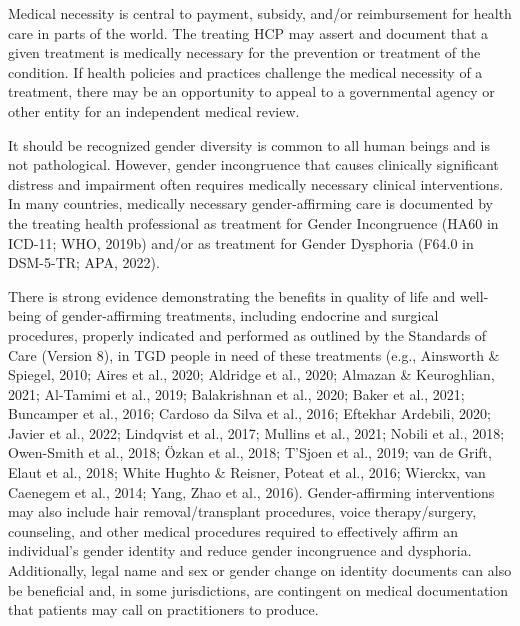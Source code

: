 \documentclass[
]{book}
\begin{document}
Medical necessity is central to payment, subsidy, and/or reimbursement for health care in
parts of the world. The treating HCP may assert
and document that a given treatment is medically
necessary for the prevention or treatment of the
condition. If health policies and practices challenge the medical necessity of a treatment, there
may be an opportunity to appeal to a governmental agency or other entity for an independent
medical review.

It should be recognized gender diversity is
common to all human beings and is not pathological. However, gender incongruence that causes
clinically significant distress and impairment
often requires medically necessary clinical
interventions. In many countries, medically necessary gender-affirming care is documented by
the treating health professional as treatment for
Gender Incongruence (HA60 in ICD-11; WHO,
2019b) and/or as treatment for Gender Dysphoria
(F64.0 in DSM-5-TR; APA, 2022).

There is strong evidence demonstrating the benefits in quality of life and well-being of
gender-affirming treatments, including endocrine
and surgical procedures, properly indicated and
performed as outlined by the Standards of Care
(Version 8), in TGD people in need of these treatments (e.g., Ainsworth \& Spiegel, 2010; Aires
et al., 2020; Aldridge et al., 2020; Almazan \&
Keuroghlian, 2021; Al-Tamimi et al., 2019;
Balakrishnan et al., 2020; Baker et al., 2021;
Buncamper et al., 2016; Cardoso da Silva et al.,
2016; Eftekhar Ardebili, 2020; Javier et al., 2022;
Lindqvist et al., 2017; Mullins et al., 2021; Nobili
et al., 2018; Owen-Smith et al., 2018; Özkan et al.,
2018; T'Sjoen et al., 2019; van de Grift, Elaut
et al., 2018; White Hughto \& Reisner, Poteat et al.,
2016; Wierckx, van Caenegem et al., 2014; Yang,
Zhao et al., 2016). Gender-affirming interventions
may also include hair removal/transplant procedures, voice therapy/surgery, counseling, and other
medical procedures required to effectively affirm
an individual's gender identity and reduce gender
incongruence and dysphoria. Additionally, legal
name and sex or gender change on identity documents can also be beneficial and, in some jurisdictions, are contingent on medical documentation
that patients may call on practitioners to produce.
\end{document}
